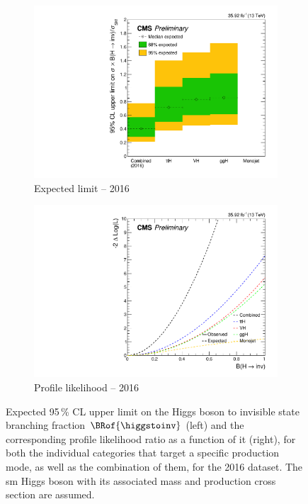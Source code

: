 \begin{figure}[htbp]
    \centering
    \begin{subfigure}[b]{0.45\textwidth}
        \includegraphics[width=\textwidth]{figures/limits/limit_2016_comb_Scenario5.pdf}
        \caption{Expected limit -- 2016}
    \end{subfigure}
    \hspace{0.05\textwidth}
    \begin{subfigure}[b]{0.45\textwidth}
        \includegraphics[width=\textwidth]{figures/likelihood_scan/profile_likelihood_scan_2016_Scenario5.pdf}
        \caption{Profile likelihood -- 2016}
    \end{subfigure}
    \caption[Expected 95\,\% CL upper limit on the Higgs boson to invisible state branching fraction $\BRof{\higgstoinv}$ and the corresponding profile likelihood ratio as a function of it, for both the individual categories that target a specific production mode, as well as the combination of them, for the 2016 dataset]{Expected 95\,\% CL upper limit on the Higgs boson to invisible state branching fraction $\BRof{\higgstoinv}$ (left) and the corresponding profile likelihood ratio as a function of it (right), for both the individual categories that target a specific production mode, as well as the combination of them, for the 2016 dataset. The \acrlong{sm} Higgs boson with its associated mass and production cross section are assumed.}
    \label{fig:htoinv_limit_likelihood_2016}
\end{figure}

